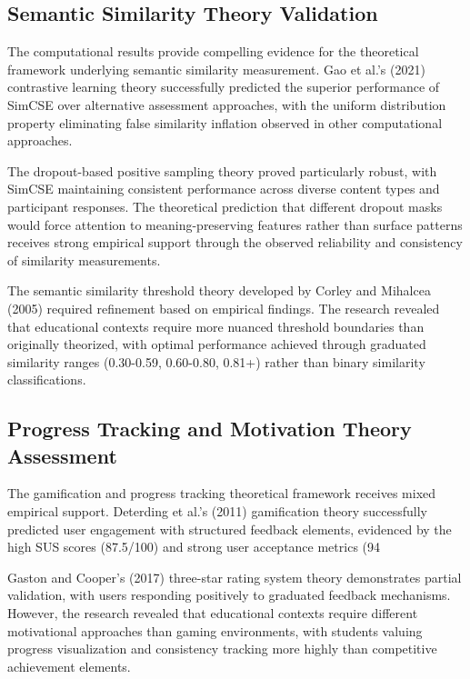 {{\subsection{Semantic Similarity Theory Validation}

The computational results provide compelling evidence for the theoretical framework underlying semantic similarity measurement. Gao et al.'s (2021) contrastive learning theory successfully predicted the superior performance of SimCSE over alternative assessment approaches, with the uniform distribution property eliminating false similarity inflation observed in other computational approaches.

The dropout-based positive sampling theory proved particularly robust, with SimCSE maintaining consistent performance across diverse content types and participant responses. The theoretical prediction that different dropout masks would force attention to meaning-preserving features rather than surface patterns receives strong empirical support through the observed reliability and consistency of similarity measurements.

The semantic similarity threshold theory developed by Corley and Mihalcea (2005) required refinement based on empirical findings. The research revealed that educational contexts require more nuanced threshold boundaries than originally theorized, with optimal performance achieved through graduated similarity ranges (0.30-0.59, 0.60-0.80, 0.81+) rather than binary similarity classifications.

\subsection{Progress Tracking and Motivation Theory Assessment}

The gamification and progress tracking theoretical framework receives mixed empirical support. Deterding et al.'s (2011) gamification theory successfully predicted user engagement with structured feedback elements, evidenced by the high SUS scores (87.5/100) and strong user acceptance metrics (94%

Gaston and Cooper's (2017) three-star rating system theory demonstrates partial validation, with users responding positively to graduated feedback mechanisms. However, the research revealed that educational contexts require different motivational approaches than gaming environments, with students valuing progress visualization and consistency tracking more highly than competitive achievement elements.

}}
